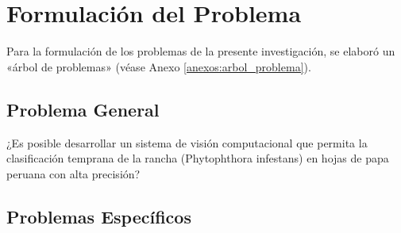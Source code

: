 

\section{Formulación del Problema}
Para la formulación de los problemas de la presente investigación, se elaboró un «árbol de problemas» (véase Anexo \ref{anexos:arbol_problema}).
\subsection{Problema General}
\newcommand{\ProblemaGeneral}{
	¿Es posible desarrollar un sistema de visión computacional que permita la clasificación temprana de la rancha (Phytophthora infestans) en hojas de papa peruana con alta precisión?
}

\ProblemaGeneral
\subsection{Problemas Espec\'{i}ficos}
\newcommand{\Pbone}{
	¿Cómo podemos desarrollar un sistema de clasificación automática de "Rancha" Phytophthora infestans en las hojas de papa peruana que sea preciso, eficiente y robusto a la variabilidad de las lesiones y las condiciones ambientales?
	
}

\newcommand{\Pbtwo}{
	¿Cómo obtener un conjunto de datos representativo y diverso de imágenes de hojas de papa que abarque diferentes variedades, etapas de crecimiento, condiciones ambientales y niveles de severidad de la Rancha?
}

\newcommand{\Pbthree}{
¿Cuáles son las técnicas de visión computacional más apropiadas para la detección temprana de "Rancha" en hojas de papa peruano y cómo pueden ser adaptadas y mejoradas para maximizar su eficacia en esta tarea?
}

\newcommand{\Pbfour}{
	¿Cómo reducir el tiempo de procesamiento requerido para analizar grandes volúmenes de imágenes de hojas de papa y proporcionar resultados de detección y clasificación en tiempo real o con una rápida respuesta?
}

